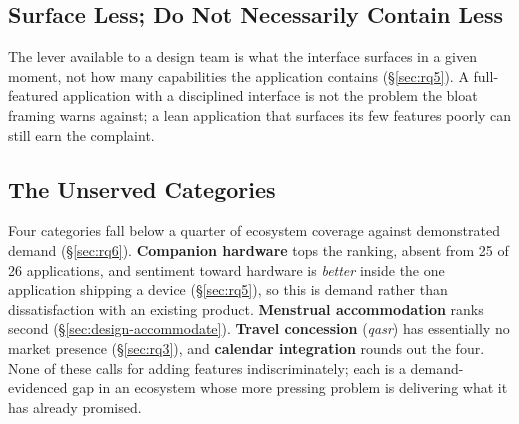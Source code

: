 \subsection{Surface Less; Do Not Necessarily Contain Less}

The lever available to a design team is what the interface surfaces in a
given moment, not how many capabilities the application contains
(\S\ref{sec:rq5}). A full-featured application with a disciplined interface is
not the problem the bloat framing warns against; a lean application that
surfaces its few features poorly can still earn the complaint.

\subsection{The Unserved Categories}

Four categories fall below a quarter of ecosystem coverage against
demonstrated demand (\S\ref{sec:rq6}). \textbf{Companion hardware} tops the
ranking, absent from 25 of 26 applications, and sentiment toward hardware is
\emph{better} inside the one application shipping a device (\S\ref{sec:rq5}),
so this is demand rather than dissatisfaction with an existing product.
\textbf{Menstrual accommodation} ranks second (\S\ref{sec:design-accommodate}).
\textbf{Travel concession} (\emph{qasr}) has essentially no market presence
(\S\ref{sec:rq3}), and \textbf{calendar integration} rounds out the four.
None of these calls for adding features indiscriminately; each is a
demand-evidenced gap in an ecosystem whose more pressing problem is delivering
what it has already promised.
